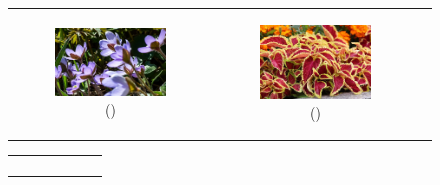 \documentclass{BachelorBUI}
\begin{document}
\begin{figure}[h]
\begin{tabular}{ccc}
\begin{subfigure}{0.30\textwidth}
                    \centering
                    \includegraphics[width=\textwidth]{8_artificial_background.jpg}
                    \caption{\centering (\cite{8_artificial_background:2009})}
                \end{subfigure} &
                \begin{subfigure}{0.30\textwidth}
                    \centering
                    \includegraphics[width=\textwidth]{9_artificial_background.jpg}
                    \caption{\centering (\cite{9_artificial_background:2016})}
                \end{subfigure} \\
            \end{tabular}
            \begin{tabular}{c}
                \begin{subfigure}{0.30\textwidth}
                    \centering

\end{subfigure}
\end{tabular}
\end{figure}
\end{document}
